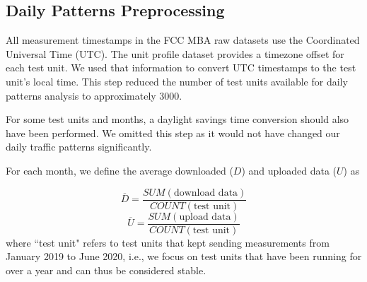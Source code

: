 \documentclass[conference,10pt]{IEEEtran}
\begin{document}
\subsection{Daily Patterns Preprocessing}

All measurement timestamps in the FCC MBA raw datasets use the Coordinated Universal Time (UTC). The unit profile dataset provides a timezone offset for each test unit. We used that information to convert UTC timestamps to the test unit's local time. This step reduced the number of test units available for daily patterns analysis to approximately 3000.

For some test units and months, a daylight savings time conversion should also have been performed. We omitted this step as it would not have changed our daily traffic patterns significantly.

For each month, we define the average downloaded ($D$) and uploaded data ($U$) as

\begin{equation}
    \overline{D} =\frac{SUM(\text{download data})}{COUNT(\text{test unit})}
\end{equation}
\begin{equation}
    \overline{U} =\frac{SUM(\text{upload data})}{COUNT(\text{test unit})}
\end{equation}
where ``test unit" refers to test units that kept sending measurements from January 2019 to June 2020, i.e., we focus on test units that have been running for over a year and can thus be considered stable.







\end{document}
